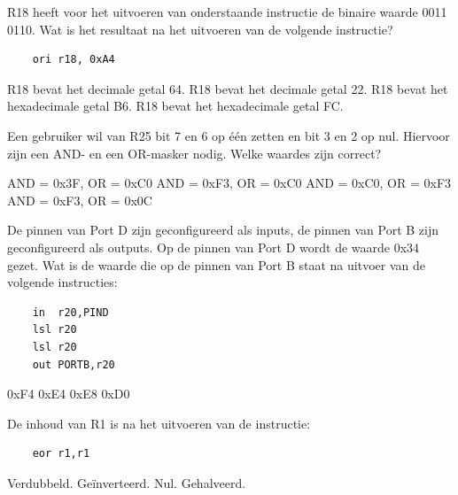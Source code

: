 \documentclass[a4paper,12pt,fleqn,dutch,mimicwordtwentyten]{tisdexam}
\begin{document}
\renewcommand{\arraystretch}{1.1}


\begin{questions}


\question
\label{opg:opg1}
R18 heeft voor het uitvoeren van onderstaande instructie de binaire waarde 0011 0110.
Wat is het resultaat na het uitvoeren van de volgende instructie?
\begin{lstlisting}
    ori r18, 0xA4
\end{lstlisting}
\begin{choices}
	\choice R18 bevat het decimale getal 64.
	\choice R18 bevat het decimale getal 22.
	\CorrectChoice \label{ans:opg1} R18 bevat het hexadecimale getal B6.
	\choice R18 bevat het hexadecimale getal FC.
\end{choices}


\question
\label{opg:opg2}
Een gebruiker wil van R25 bit 7 en 6 op \'{e}\'{e}n zetten en bit 3 en 2 op nul. Hiervoor zijn een
AND- en een OR-masker nodig. Welke waardes zijn correct?
\begin{choices}
	\choice AND = 0x3F, OR = 0xC0
	\CorrectChoice \label{ans:opg2} AND = 0xF3, OR = 0xC0
	\choice AND = 0xC0, OR = 0xF3
	\choice AND = 0xF3, OR = 0x0C
\end{choices}


\question
\label{opg:opg3}
De pinnen van Port D zijn geconfigureerd als inputs, de pinnen van Port B zijn geconfigureerd als
outputs. Op de pinnen van Port D wordt de waarde 0x34 gezet.
Wat is de waarde die op de pinnen van Port B staat na uitvoer van de volgende instructies:
\begin{lstlisting}
    in  r20,PIND
    lsl r20
    lsl r20
    out PORTB,r20
\end{lstlisting}
\begin{choices}
	\choice 0xF4
	\choice 0xE4
	\choice 0xE8
	\CorrectChoice \label{ans:opg3} 0xD0
\end{choices}


\question
\label{opg:opg4}
De inhoud van R1 is na het uitvoeren van de instructie:
\begin{lstlisting}
    eor r1,r1
\end{lstlisting}
\begin{choices}
	\choice Verdubbeld.
	\choice Ge\"{i}nverteerd.
	\CorrectChoice \label{ans:opg4} Nul.
	\choice Gehalveerd.
\end{choices}



\end{questions}
\end{document}
